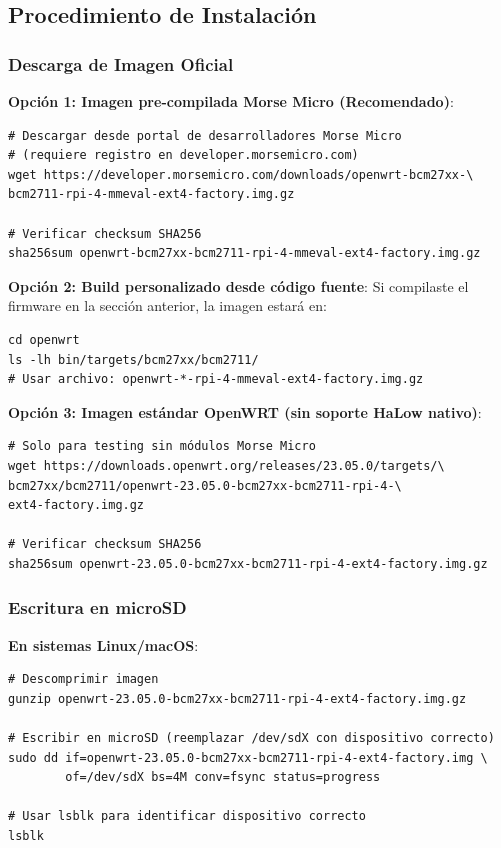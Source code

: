 \subsection{Procedimiento de Instalación}

\subsubsection{Descarga de Imagen Oficial}

\textbf{Opción 1: Imagen pre-compilada Morse Micro (Recomendado)}:
\begin{verbatim}
# Descargar desde portal de desarrolladores Morse Micro
# (requiere registro en developer.morsemicro.com)
wget https://developer.morsemicro.com/downloads/openwrt-bcm27xx-\
bcm2711-rpi-4-mmeval-ext4-factory.img.gz

# Verificar checksum SHA256
sha256sum openwrt-bcm27xx-bcm2711-rpi-4-mmeval-ext4-factory.img.gz
\end{verbatim}

\textbf{Opción 2: Build personalizado desde código fuente}:
Si compilaste el firmware en la sección anterior, la imagen estará en:
\begin{verbatim}
cd openwrt
ls -lh bin/targets/bcm27xx/bcm2711/
# Usar archivo: openwrt-*-rpi-4-mmeval-ext4-factory.img.gz
\end{verbatim}

\textbf{Opción 3: Imagen estándar OpenWRT (sin soporte HaLow nativo)}:
\begin{verbatim}
# Solo para testing sin módulos Morse Micro
wget https://downloads.openwrt.org/releases/23.05.0/targets/\
bcm27xx/bcm2711/openwrt-23.05.0-bcm27xx-bcm2711-rpi-4-\
ext4-factory.img.gz

# Verificar checksum SHA256
sha256sum openwrt-23.05.0-bcm27xx-bcm2711-rpi-4-ext4-factory.img.gz
\end{verbatim}

\subsubsection{Escritura en microSD}

\textbf{En sistemas Linux/macOS}:
\begin{verbatim}
# Descomprimir imagen
gunzip openwrt-23.05.0-bcm27xx-bcm2711-rpi-4-ext4-factory.img.gz

# Escribir en microSD (reemplazar /dev/sdX con dispositivo correcto)
sudo dd if=openwrt-23.05.0-bcm27xx-bcm2711-rpi-4-ext4-factory.img \
        of=/dev/sdX bs=4M conv=fsync status=progress

# Usar lsblk para identificar dispositivo correcto
lsblk
\end{verbatim}

